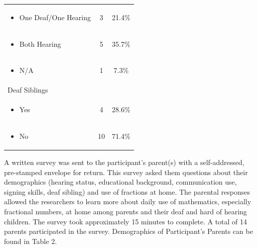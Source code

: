 \documentclass[11.5pt]{sig-alternate} %
\begin{document}
\begin{large}
\begin{table}[ht]
\begin{tabular}{|l|c|c|}
\begin{itemize}[noitemsep, topsep=0pt] \item One Deaf/One Hearing \end{itemize} & 3 & 21.4\% \\
\begin{itemize}[noitemsep, topsep=0pt] \item Both Hearing \end{itemize} & 5 & 35.7\% \\
\begin{itemize}[noitemsep, topsep=0pt] \item N/A \end{itemize} & 1 & 7.3\% \\ \hline
Deaf Siblings & & \\
\begin{itemize}[noitemsep, topsep=0pt] \item Yes \end{itemize} & 4 & 28.6\% \\
\begin{itemize}[noitemsep, topsep=0pt] \item No \end{itemize} & 10 & 71.4\% \\ \hline
\end{tabular}
\end{table}

A written survey was sent to the participant's parent(s) with a self-addressed, pre-stamped envelope for return. This survey asked them questions about their demographics (hearing status, educational background, communication use, signing skills, deaf sibling) and use of fractions at home. The parental responses allowed the researchers to learn more about daily use of mathematics, especially fractional numbers, at home among parents and their deaf and hard of hearing children. The survey took approximately 15 minutes to complete. A total of 14 parents participated in the survey. Demographics of Participant's Parents can be found in Table 2.


\end{large}
\end{document}
